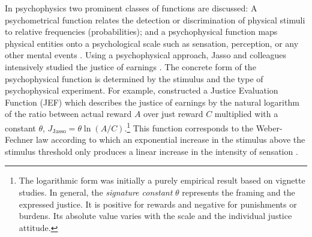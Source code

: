\documentclass[12pt]{scrartcl}
\begin{document}
In psychophysics two prominent classes of functions are discussed: A psychometrical function relates the detection or discrimination of physical stimuli to relative frequencies (probabilities); and a psychophysical function maps physical entities onto a psychological scale such as sensation, perception, or any other mental events \citep[p.~91]{marks_psychophysical_2002}.
Using a psychophysical approach, Jasso and colleagues intensively studied the justice of earnings \citep[e.\,g.,][]{jasso_distributive_1977,jasso_justice_1978,jasso_methods_1990,jasso_methods_1997,jasso_how_1999}.
The concrete form of the psychophysical function is determined by the stimulus and the type of psychophysical experiment.
For example, \citet[p.~138]{jasso_how_1999} constructed a Justice Evaluation Function (JEF) which describes the justice of earnings by the natural logarithm of the ratio between actual reward $A$ over just reward $C$ multiplied with a constant $\theta$, $J_\text{Jasso}=\theta\ln(A/C)$.\footnote{The logarithmic form was initially a purely empirical result based on vignette studies. In general, the \textit{signature constant} $\theta$ represents the framing and the expressed justice. It is positive for rewards and negative for punishments or burdens. Its absolute value varies with the scale and the individual justice attitude.}
This function corresponds to the Weber-Fechner law according to which an exponential increase in the stimulus above the stimulus threshold only produces a linear increase in the intensity of sensation \cite[see][p.~409, and the literature stated therein]{jasso_methods_1997}.
\end{document}
